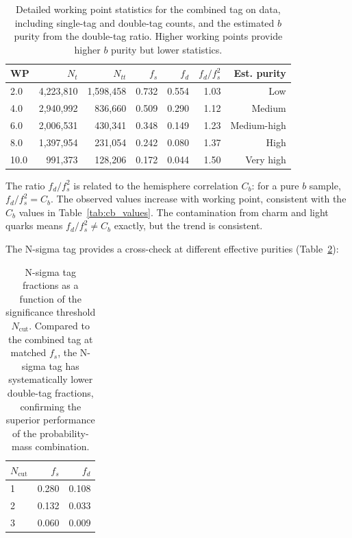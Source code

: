 \documentclass[11pt,a4paper]{article}
\begin{document}
\begin{table}[htbp]
\centering
\caption{Detailed working point statistics for the combined tag on data, including
single-tag and double-tag counts, and the estimated $b$ purity from the double-tag
ratio. Higher working points provide higher $b$ purity but lower statistics.}
\label{tab:wp_detail}
\begin{tabular}{lrrrrrr}
\toprule
WP & $N_t$ & $N_{tt}$ & $f_s$ & $f_d$ & $f_d/f_s^2$ & Est. purity \\
\midrule
2.0 & 4,223,810 & 1,598,458 & 0.732 & 0.554 & 1.03 & Low \\
4.0 & 2,940,992 & 836,660 & 0.509 & 0.290 & 1.12 & Medium \\
6.0 & 2,006,531 & 430,341 & 0.348 & 0.149 & 1.23 & Medium-high \\
8.0 & 1,397,954 & 231,054 & 0.242 & 0.080 & 1.37 & High \\
10.0 & 991,373 & 128,206 & 0.172 & 0.044 & 1.50 & Very high \\
\bottomrule
\end{tabular}
\end{table}

The ratio $f_d / f_s^2$ is related to the hemisphere correlation $C_b$: for a pure $b$
sample, $f_d / f_s^2 = C_b$. The observed values increase with working point, consistent
with the $C_b$ values in Table~\ref{tab:cb_values}. The contamination from charm and
light quarks means $f_d / f_s^2 \neq C_b$ exactly, but the trend is consistent.

The N-sigma tag provides a cross-check at different effective purities
(Table~\ref{tab:nsigma_fractions}):

\begin{table}[htbp]
\centering
\caption{N-sigma tag fractions as a function of the significance threshold $N_\mathrm{cut}$.
Compared to the combined tag at matched $f_s$, the N-sigma tag has systematically lower
double-tag fractions, confirming the superior performance of the probability-mass combination.}
\label{tab:nsigma_fractions}
\begin{tabular}{lrr}
\toprule
$N_\mathrm{cut}$ & $f_s$ & $f_d$ \\
\midrule
1 & 0.280 & 0.108 \\
2 & 0.132 & 0.033 \\
3 & 0.060 & 0.009 \\
\bottomrule
\end{tabular}
\end{table}
\end{document}
